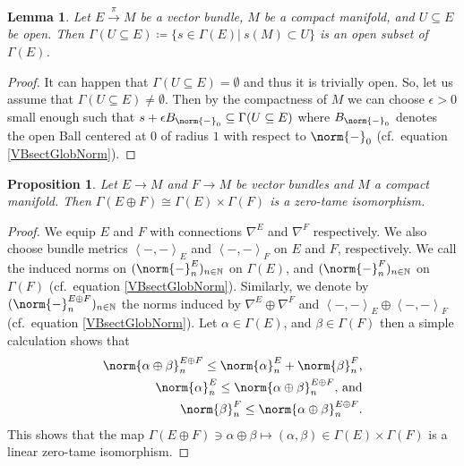 \documentclass[12pt,a4paper]{article}
\theoremstyle{plain}
\newtheorem{lemma}[theorem]{Lemma}
\newtheorem{proposition}[theorem]{Proposition}
\theoremstyle{definition}
\newcommand{\tn}{\textnormal}
\newcommand{\N}{\mathbb{N}}
\newcommand{\nnorm}[2]{\norm{#1}_{#2}}
\newcommand{\scal}[2]{\left\langle #1,#2\right\rangle}
\begin{document}
\begin{lemma}
\label{Lemma:Gamma(UsubE)Open}
Let $E\xrightarrow{\pi} M$ be a vector bundle, $M$ be a compact manifold, and $U\subseteq E$ be open. Then $\Gamma(U\subseteq E)\coloneqq \{s\in \Gamma(E)|~s(M)\subset U\}$ is an open subset of $\Gamma(E)$.
\end{lemma}
\begin{proof}
It can happen that $\Gamma(U\subseteq E)=\emptyset$ and thus it is trivially open.
So, let us assume that $\Gamma(U\subseteq E)\neq\emptyset$. Then by the compactness of $M$ we can choose $\epsilon >0$ small enough such that $s+\epsilon B_{\nnorm{-}{0}}\subseteq \Gamma(U\subseteq E)$ where $B_{\nnorm{-}{0}}$ denotes the open Ball centered at $0$ of radius $1$ with respect to $\nnorm{-}{0}$ (cf.~equation \eqref{VBsectGlobNorm}).
\end{proof}


\begin{proposition}
\label{Prop:EplusFsect}
Let $E\to M$ and $F\to M$ be vector bundles and $M$ a compact manifold. Then $\Gamma(E\oplus F)\cong\Gamma(E)\times\Gamma(F)$ is a zero-tame isomorphism.
\end{proposition}
\begin{proof}
We equip $E$ and $F$ with connections $\nabla^E$ and $\nabla^F$ respectively. We also choose bundle metrics $\scal{-}{-}_E$ and $\scal{-}{-}_F$ on $E$ and $F$, respectively. We call the induced norms on $(\nnorm{-}{n}^E)_{n\in \N}$ on $\Gamma(E)$, and $(\nnorm{-}{n}^F)_{n\in \N}$ on $\Gamma(F)$ (cf.~equation \eqref{VBsectGlobNorm}). Similarly, we denote by $(\nnorm{-}{n}^{E\oplus F})_{n\in \N}$ the norms induced by $\nabla^E\oplus \nabla^F$ and $\scal{-}{-}_E\oplus\scal{-}{-}_F$ (cf.~equation \eqref{VBsectGlobNorm}).
Let $\alpha\in \Gamma(E)$, and $\beta\in\Gamma(F)$ then a simple calculation shows that
\begin{align*}
    \nnorm{\alpha\oplus\beta}{n}^{E\oplus F}\leq \nnorm{\alpha}{n}^E+\nnorm{\beta}{n}^F\tn{,}\\
    \nnorm{\alpha}{n}^E\leq\nnorm{\alpha\oplus\beta}{n}^{E\oplus F}\tn{, and}\\
    \nnorm{\beta}{n}^F\leq \nnorm{\alpha\oplus\beta}{n}^{E\oplus F}.
\end{align*}
This shows that the map $\Gamma(E\oplus F)\ni\alpha\oplus \beta\mapsto (\alpha,\beta)\in \Gamma(E)\times\Gamma(F)$ is a linear zero-tame isomorphism.
\end{proof}
\end{document}

